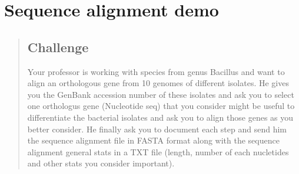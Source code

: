 \documentclass[
  letterpaper,
  DIV=11,
  numbers=noendperiod]{scrreprt}
\newenvironment{Shaded}{\begin{snugshade}}{\end{snugshade}}
\newcommand{\AttributeTok}[1]{\textcolor[rgb]{0.40,0.46,0.14}{#1}}
\newcommand{\ControlFlowTok}[1]{\textcolor[rgb]{0.00,0.46,0.62}{#1}}
\newcommand{\FunctionTok}[1]{\textcolor[rgb]{0.28,0.35,0.67}{#1}}
\newcommand{\NormalTok}[1]{\textcolor[rgb]{0.00,0.46,0.62}{#1}}
\newcommand{\OtherTok}[1]{\textcolor[rgb]{0.00,0.46,0.62}{#1}}
\newcommand{\SpecialCharTok}[1]{\textcolor[rgb]{0.37,0.37,0.37}{#1}}
\newcommand{\StringTok}[1]{\textcolor[rgb]{0.13,0.47,0.30}{#1}}
\begin{document}
\begin{Shaded}
\end{Shaded}

\hypertarget{sequence-alignment-demo}{%
\chapter{Sequence alignment demo}\label{sequence-alignment-demo}}

\begin{quote}
\hypertarget{challenge-2}{%
\section*{Challenge}\label{challenge-2}}

Your professor is working with species from genus Bacillus and want to
align an orthologous gene from 10 genomes of different isolates. He
gives you the GenBank accession number of these isolates and ask you to
select one orthologus gene (Nucleotide seq) that you consider might be
useful to differentiate the bacterial isolates and ask you to align
those genes as you better consider. He finally ask you to document each
step and send him the sequence alignment file in FASTA format along with
the sequence alignment general stats in a TXT file (length, number of
each nucletides and other stats you consider important).
\end{quote}
\end{document}
